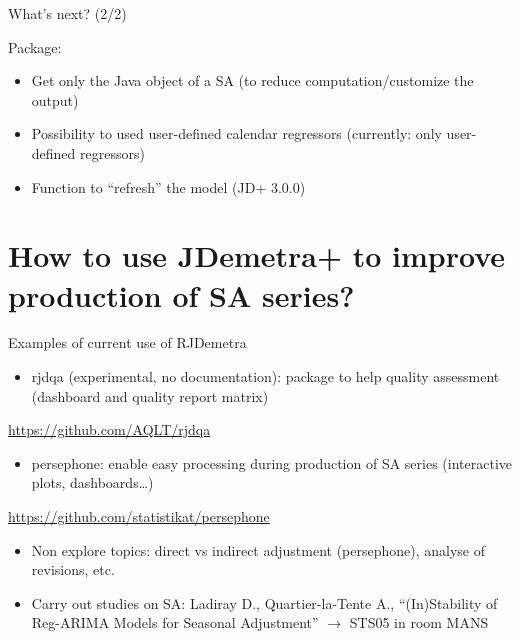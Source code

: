 \documentclass[10pt,xcolor=table,color={dvipsnames,usenames},ignorenonframetext,usepdftitle=false,french]{beamer}
\providecommand{\tightlist}{%
  \setlength{\parskip}{0pt}
  }
\begin{document}
\begin{frame}{What's next? \bcpanchant (2/2)}
\protect\hypertarget{whats-next-22}{}

Package:

\begin{itemize}
\item
  Get only the Java object of a SA (to reduce computation/customize the
  output)
\item
  Possibility to used user-defined calendar regressors (currently: only
  user-defined regressors)
\item
  Function to ``refresh'' the model (JD+ 3.0.0)
\end{itemize}

\end{frame}

\hypertarget{how-to-use-jdemetra-to-improve-production-of-sa-series}{%
\section{How to use JDemetra+ to improve production of SA
series?}\label{how-to-use-jdemetra-to-improve-production-of-sa-series}}

\begin{frame}{Examples of current use of RJDemetra}
\protect\hypertarget{examples-of-current-use-of-rjdemetra}{}

\begin{itemize}
\tightlist
\item
  rjdqa (experimental, no documentation): package to help quality
  assessment (dashboard and quality report matrix)
\end{itemize}

\faGithub{} \url{https://github.com/AQLT/rjdqa}

\begin{itemize}
\tightlist
\item
  persephone: enable easy processing during production of SA series
  (interactive plots, dashboards\ldots{})
\end{itemize}

\faGithub{} \url{https://github.com/statistikat/persephone}

\begin{itemize}
\item
  Non explore topics: direct vs indirect adjustment (persephone),
  analyse of revisions, etc.
\item
  Carry out studies on SA: Ladiray D., Quartier-la-Tente A.,
  ``(In)Stability of Reg-ARIMA Models for Seasonal Adjustment''
  \(\rightarrow\) STS05 in room MANS
\end{itemize}

\end{frame}
\end{document}

